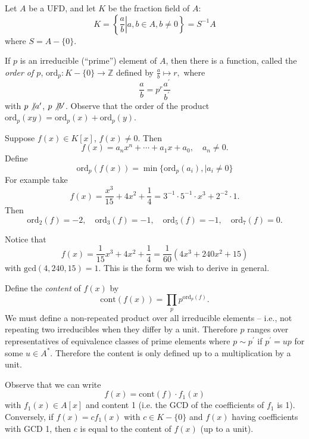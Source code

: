Let $A$ be a UFD, and let $K$ be the fraction field of $A$:
$$
K = \left\{ \left. \frac{a}{b} \right| a, b \in A, b \neq 0 \right\}
  = S^{-1} A
$$
where $S = A - \{ 0 \}$.

If $p$ is an irreducible (``prime'') element of $A$, then there is a
function, called the \emph{order of $p$},
$\mathrm{ord}_p : K - \{ 0 \} \to \mathbb{Z}$ defined by
$\frac{a}{b} \mapsto r,$
where
$$
\frac{a}{b} = p^r \frac{a^\prime}{b^\prime}
$$
with $p \not\vert a^\prime$, $p \not\vert b^\prime$. Observe that the
order of the product
$\mathrm{ord}_p(xy) = \mathrm{ord}_p(x) + \mathrm{ord}_p(y)$.

Suppose $f(x) \in K[x]$, $f(x) \neq 0$. Then
$$
f(x) = a_n x^n + \cdots + a_1 x + a_0, \quad a_n \neq 0.
$$
Define
$$
\mathrm{ord}_p(f(x)) = \min \{
                               \mathrm{ord}_p(a_i),
                            \mid
                               a_i \neq 0
                            \}
$$
For example take
$$
f(x) = \frac{x^3}{15} + 4x^2 + \frac{1}{4}
     = 3^{-1} \cdot 5^{-1} \cdot x^3 + 2^{-2} \cdot 1.
$$
Then
$$
\mathrm{ord}_2(f) = -2, \quad
\mathrm{ord}_3(f) = -1, \quad
\mathrm{ord}_5(f) = -1, \quad
\mathrm{ord}_7(f) = 0.
$$

Notice that
$$
f(x) = \frac{1}{15} x^3 + 4x^2 + \frac{1}{4}
     = \frac{1}{60} (4x^3 + 240x^2 + 15)
$$
with $\mathrm{gcd}(4, 240, 15) = 1$. This is the form we wish to
derive in general.

Define the \emph{content} of $f(x)$ by
$$
\mathrm{cont}(f(x)) = \prod_p p^{\mathrm{ord}_p(f)}.
$$
We must define a non-repeated product over all irreducible elements
-- i.e., not repeating two irreducibles when they differ by a
unit. Therefore $p$ ranges over representatives of equivalence classes
of prime elements where $p \sim p^\prime$ if $p^\prime = u p$ for some
$u \in A^\ast$. Therefore the content is only defined up to a
multiplication by a unit.

Observe that we can write
$$
f(x) = \mathrm{cont}(f) \cdot f_1(x)
$$
with $f_1(x) \in A[x]$ and content 1 (i.e. the GCD of the coefficients
of $f_1$ is 1). Conversely, if $f(x) = c f_1(x)$ with $c \in K - \{ 0
\}$ and $f(x)$ having coefficients with GCD 1, then $c$ is equal to
the content of $f(x)$ (up to a unit).

